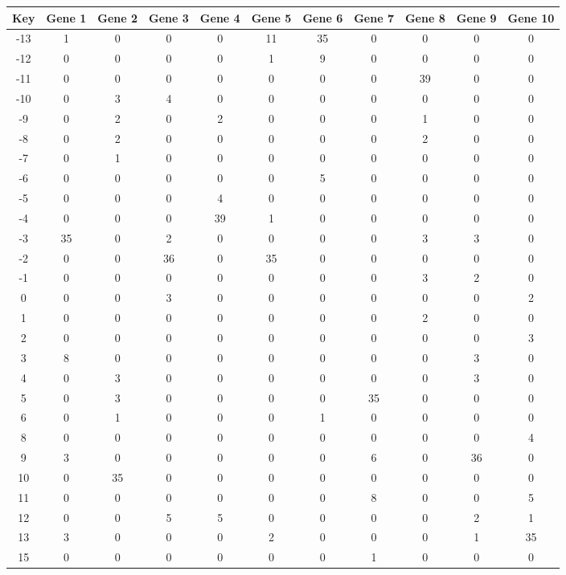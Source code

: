 \begin{tabular}{|c|c|c|c|c|c|c|c|c|c|c|}
\hline
Key & Gene 1 & Gene 2 & Gene 3 & Gene 4 & Gene 5 & Gene 6 & Gene 7 & Gene 8 & Gene 9 & Gene 10 \\
\hline
-13 & 1 & 0 & 0 & 0 & 11 & 35 & 0 & 0 & 0 & 0 \\
-12 & 0 & 0 & 0 & 0 & 1 & 9 & 0 & 0 & 0 & 0 \\
-11 & 0 & 0 & 0 & 0 & 0 & 0 & 0 & 39 & 0 & 0 \\
-10 & 0 & 3 & 4 & 0 & 0 & 0 & 0 & 0 & 0 & 0 \\
-9 & 0 & 2 & 0 & 2 & 0 & 0 & 0 & 1 & 0 & 0 \\
-8 & 0 & 2 & 0 & 0 & 0 & 0 & 0 & 2 & 0 & 0 \\
-7 & 0 & 1 & 0 & 0 & 0 & 0 & 0 & 0 & 0 & 0 \\
-6 & 0 & 0 & 0 & 0 & 0 & 5 & 0 & 0 & 0 & 0 \\
-5 & 0 & 0 & 0 & 4 & 0 & 0 & 0 & 0 & 0 & 0 \\
-4 & 0 & 0 & 0 & 39 & 1 & 0 & 0 & 0 & 0 & 0 \\
-3 & 35 & 0 & 2 & 0 & 0 & 0 & 0 & 3 & 3 & 0 \\
-2 & 0 & 0 & 36 & 0 & 35 & 0 & 0 & 0 & 0 & 0 \\
-1 & 0 & 0 & 0 & 0 & 0 & 0 & 0 & 3 & 2 & 0 \\
0 & 0 & 0 & 3 & 0 & 0 & 0 & 0 & 0 & 0 & 2 \\
1 & 0 & 0 & 0 & 0 & 0 & 0 & 0 & 2 & 0 & 0 \\
2 & 0 & 0 & 0 & 0 & 0 & 0 & 0 & 0 & 0 & 3 \\
3 & 8 & 0 & 0 & 0 & 0 & 0 & 0 & 0 & 3 & 0 \\
4 & 0 & 3 & 0 & 0 & 0 & 0 & 0 & 0 & 3 & 0 \\
5 & 0 & 3 & 0 & 0 & 0 & 0 & 35 & 0 & 0 & 0 \\
6 & 0 & 1 & 0 & 0 & 0 & 1 & 0 & 0 & 0 & 0 \\
8 & 0 & 0 & 0 & 0 & 0 & 0 & 0 & 0 & 0 & 4 \\
9 & 3 & 0 & 0 & 0 & 0 & 0 & 6 & 0 & 36 & 0 \\
10 & 0 & 35 & 0 & 0 & 0 & 0 & 0 & 0 & 0 & 0 \\
11 & 0 & 0 & 0 & 0 & 0 & 0 & 8 & 0 & 0 & 5 \\
12 & 0 & 0 & 5 & 5 & 0 & 0 & 0 & 0 & 2 & 1 \\
13 & 3 & 0 & 0 & 0 & 2 & 0 & 0 & 0 & 1 & 35 \\
15 & 0 & 0 & 0 & 0 & 0 & 0 & 1 & 0 & 0 & 0 \\
\hline
\end{tabular}